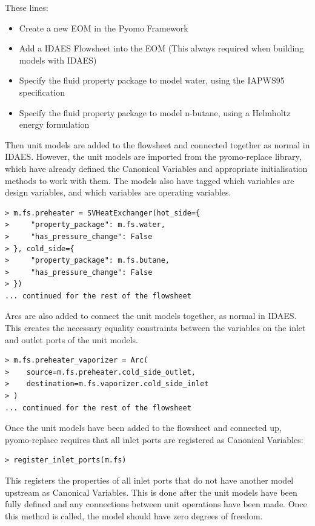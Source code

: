 These lines:

\begin{itemize}
\tightlist
\item
  Create a new EOM in the Pyomo Framework
\item
  Add a IDAES Flowsheet into the EOM (This always required when building
  models with IDAES)
\item
  Specify the fluid property package to model water, using the IAPWS95
  specification \citep{wagner2002iapws}
\item
  Specify the fluid property package to model n-butane, using a Helmholtz
  energy formulation \citep{bucker2006reference}
\end{itemize}

Then unit models are added to the flowsheet and connected together as normal in IDAES. However,
the unit models are imported from the pyomo-replace library, which have already defined the Canonical Variables 
and appropriate initialisation methods to work with them. The models also have tagged which variables are design variables,
and which variables are operating variables.


\begin{verbatim}
> m.fs.preheater = SVHeatExchanger(hot_side={
>     "property_package": m.fs.water,
>     "has_pressure_change": False
> }, cold_side={
>     "property_package": m.fs.butane,
>     "has_pressure_change": False
> })
... continued for the rest of the flowsheet
\end{verbatim}

Arcs are also added to connect the unit models together, as normal in IDAES. 
This creates the necessary equality constraints between the variables 
on the inlet and outlet ports of the unit models.

\begin{verbatim}
> m.fs.preheater_vaporizer = Arc(
>    source=m.fs.preheater.cold_side_outlet, 
>    destination=m.fs.vaporizer.cold_side_inlet
> )
... continued for the rest of the flowsheet
\end{verbatim}

Once the unit models
have been added to the flowsheet and connected up, pyomo-replace
requires that all inlet ports are registered as Canonical Variables:

\begin{verbatim}
> register_inlet_ports(m.fs)
\end{verbatim}

This registers the properties of all inlet ports that do not have
another model upstream as Canonical Variables. This is done after the unit models
have been fully defined and any connections between unit operations have
been made. Once this method is called, the model should have zero
degrees of freedom.

